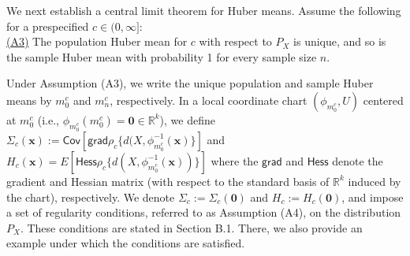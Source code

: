 \documentclass[preprint]{imsart}
\newcommand{\bbR}{\mathbb{R}}
\theoremstyle{plain}
\newtheorem{corollary}{Corollary}
\theoremstyle{remark}
\begin{document}


We next establish a central limit theorem for Huber means. 
Assume the following for a prespecified $c \in (0,\infty]$:\\
\indent \underline{(A3)} The population Huber mean for $c$ with respect to $P_{X}$ is unique, and so is the sample Huber mean with probability 1 for every sample size $n$. 

Under Assumption (A3), we write the unique population and sample Huber means by $m^{c}_{0}$ and $m^{c}_{n}$, respectively. In a local coordinate chart $(\phi_{m^{c}_{0}}, U)$ centered at $m_{0}^{c}$ (i.e., $\phi_{m_{0}^{c}}(m_{0}^{c})= \mathbf{0} \in \bbR^{k}$), we define $\Sigma_{c}(\mathbf{x}):=\textsf{Cov}[\textsf{grad}\rho_{c}\{d(X, \phi_{m_{0}^{c}}^{-1}(\mathbf{x})\}]$  and $H_{c}(\mathbf{x})= E[\textsf{Hess}\rho_{c}\{d(X, \phi_{m_{0}^{c}}^{-1}(\mathbf{x}))\}]$ where the $\textsf{grad}$ and $\textsf{Hess}$ denote the gradient and Hessian matrix (with respect to the standard basis of $\mathbb{R}^k$ induced by the chart), respectively. We denote $\Sigma_{c}:=\Sigma_{c}(\mathbf{0})$ and $H_{c}:=H_{c}(\mathbf{0})$, and impose a set of regularity conditions, referred to as Assumption (A4), on the distribution $P_X$. These conditions are stated in Section B.1. There, we also provide an example under which the conditions are satisfied. 
\end{document}
